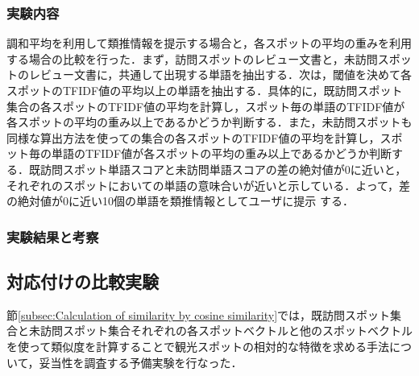 \documentclass{deimj}
\begin{document}
\subsubsection{実験内容}
調和平均を利用して類推情報を提示する場合と，各スポットの平均の重みを利用する場合の比較を行った．まず，訪問スポットのレビュー文書と，未訪問スポットのレビュー文書に，共通して出現する単語を抽出する．次は，閾値を決めて各スポットのTFIDF値の平均以上の単語を抽出する．具体的に，既訪問スポット集合の各スポットのTFIDF値の平均を計算し，スポット毎の単語のTFIDF値が各スポットの平均の重み以上であるかどうか判断する．また，未訪問スポットも同様な算出方法を使っての集合の各スポットのTFIDF値の平均を計算し，スポット毎の単語のTFIDF値が各スポットの平均の重み以上であるかどうか判断する．既訪問スポット単語スコアと未訪問単語スコアの差の絶対値が0に近いと，それぞれのスポットにおいての単語の意味合いが近いと示している．よって，差の絶対値が0に近い10個の単語を類推情報としてユーザに提示
する．

\subsubsection{実験結果と考察}



\subsection{対応付けの比較実験}
\label{subsec:Comparative experiment of correspondence}
節\ref{subsec:Calculation of similarity by cosine similarity}では，既訪問スポット集合と未訪問スポット集合それぞれの各スポットベクトルと他のスポットベクトルを使って類似度を計算することで観光スポットの相対的な特徴を求める手法について，妥当性を調査する予備実験を行なった．

\end{document}
